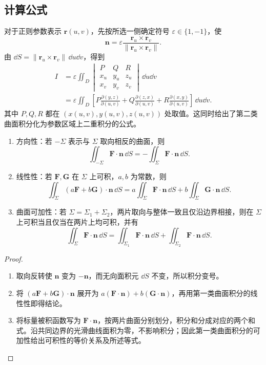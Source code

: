 \subsection*{计算公式}
对于正则参数表示 $\boldsymbol r(u,v)$，先按所选一侧确定符号 $\varepsilon\in\{1,-1\}$，使
\[
\boldsymbol n=\varepsilon\frac{\boldsymbol r_u\times\boldsymbol r_v}{\lVert\boldsymbol r_u\times\boldsymbol r_v\rVert}.
\]
由 $\dd S=\lVert\boldsymbol r_u\times\boldsymbol r_v\rVert\,\dd u\dd v$，得到
\begin{align*}
I&=\varepsilon\displaystyle\iint_D
\begin{vmatrix}P&Q&R\\x_u&y_u&z_u\\x_v&y_v&z_v\end{vmatrix}\,\dd u\dd v\\
&=\varepsilon\displaystyle\iint_D\left[
P\frac{\partial(y,z)}{\partial(u,v)}+
Q\frac{\partial(z,x)}{\partial(u,v)}+
R\frac{\partial(x,y)}{\partial(u,v)}\right]\,\dd u\dd v.
\end{align*}
其中 $P,Q,R$ 都在 $(x(u,v),y(u,v),z(u,v))$ 处取值。这同时给出了第二类曲面积分化为参数区域上二重积分的公式。

\begin{proposition}
\begin{enumerate}
\item 方向性：若 $-\Sigma$ 表示与 $\Sigma$ 取向相反的曲面，则
\[
\displaystyle\iint_{-\Sigma}\boldsymbol F\cdot\boldsymbol n\,\dd S
=-\displaystyle\iint_\Sigma\boldsymbol F\cdot\boldsymbol n\,\dd S.
\]
\item 线性性：若 $\boldsymbol F,\boldsymbol G$ 在 $\Sigma$ 上可积，$a,b$ 为常数，则
\[
\displaystyle\iint_\Sigma(a\boldsymbol F+b\boldsymbol G)\cdot\boldsymbol n\,\dd S
=a\displaystyle\iint_\Sigma\boldsymbol F\cdot\boldsymbol n\,\dd S
+b\displaystyle\iint_\Sigma\boldsymbol G\cdot\boldsymbol n\,\dd S.
\]
\item 曲面可加性：若 $\Sigma=\Sigma_1+\Sigma_2$，两片取向与整体一致且仅沿边界相接，则在 $\Sigma$ 上可积当且仅当在两片上均可积，并有
\[
\displaystyle\iint_\Sigma\boldsymbol F\cdot\boldsymbol n\,\dd S
=\displaystyle\iint_{\Sigma_1}\boldsymbol F\cdot\boldsymbol n\,\dd S
+\displaystyle\iint_{\Sigma_2}\boldsymbol F\cdot\boldsymbol n\,\dd S.
\]
\end{enumerate}
\end{proposition}
\begin{proof}
\begin{enumerate}
\item 取向反转使 $\boldsymbol n$ 变为 $-\boldsymbol n$，而无向面积元 $\dd S$ 不变，所以积分变号。
\item 将 $(a\boldsymbol F+b\boldsymbol G)\cdot\boldsymbol n$ 展开为 $a(\boldsymbol F\cdot\boldsymbol n)+b(\boldsymbol G\cdot\boldsymbol n)$，再用第一类曲面积分的线性性即得结论。
\item 将标量被积函数写为 $\boldsymbol F\cdot\boldsymbol n$，按两片曲面分别划分，积分和分成对应的两个和式。沿共同边界的光滑曲线面积为零，不影响积分；因此第一类曲面积分的可加性给出可积性的等价关系及所述等式。
\end{enumerate}
\end{proof}

